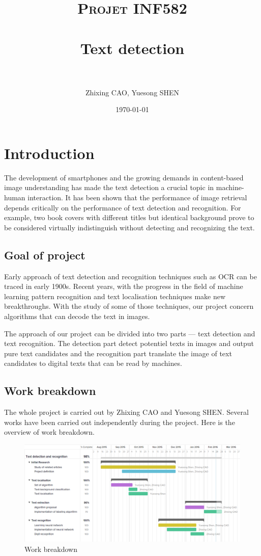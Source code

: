 \documentclass[paper=a4, french, 11pt]{scrartcl}
\title{	
\normalfont \normalsize 
\textsc{Projet INF582} \\ [25pt] 
\horrule{0.5pt} \\[0.5cm] %
\huge Text detection \\ %
\horrule{2pt} \\[0.5cm] %
}
\author{Zhixing CAO, Yuesong SHEN} %
\date{\normalsize\today} %
\begin{document}
\setlength\parindent{12pt}
\maketitle %

\section{Introduction}
The development of smartphones and the growing demands in content-based image understanding has made the text detection a crucial topic in machine-human interaction. It has been shown that the performance of image retrieval depends critically on the performance of text detection and recognition. For example, two book covers with different titles but identical background prove to be considered virtually indistinguish without detecting and recognizing the text.

\subsection{Goal of project}
Early approach of text detection and recognition techniques such as OCR can be traced in early 1900s. Recent years, with the progress in the field of machine learning pattern recognition and text localisation techniques make new breakthroughs. With the study of some of those techniques, our project concern algorithms that can decode the text in images.

The approach of our project can be divided into two parts --- text detection and text recognition. The detection part detect potentiel texts in images and output pure text candidates and the recognition part translate the image of text candidates to digital texts that can be read by machines.

\subsection{Work breakdown}
The whole project is carried out by Zhixing CAO and Yuesong SHEN. Several works have been carried out independently during the project. Here is the overview of work breakdown.\
\begin{figure}[h]
\begin{center}
	\vspace{-3ex}
   \includegraphics[width=0.75\linewidth]{breakdowns.png}
\end{center}
\vspace{-4ex}
\caption{Work breakdown}
\label{fig:heatmap}
\end{figure}
 
\end{document}
